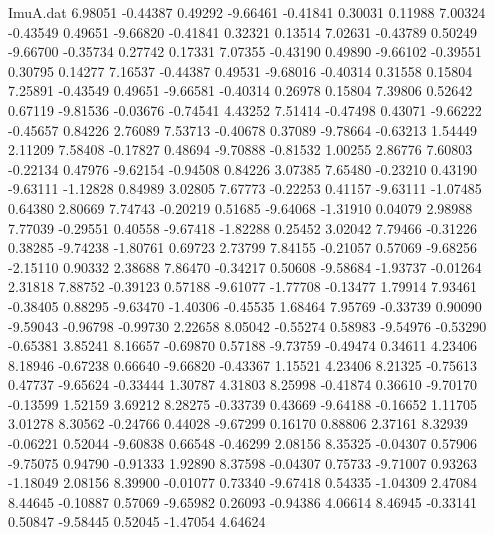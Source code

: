\begin{filecontents}{ImuA.dat}
   6.98051   -0.44387    0.49292   -9.66461   -0.41841    0.30031    0.11988
   7.00324   -0.43549    0.49651   -9.66820   -0.41841    0.32321    0.13514
   7.02631   -0.43789    0.50249   -9.66700   -0.35734    0.27742    0.17331
   7.07355   -0.43190    0.49890   -9.66102   -0.39551    0.30795    0.14277
   7.16537   -0.44387    0.49531   -9.68016   -0.40314    0.31558    0.15804
   7.25891   -0.43549    0.49651   -9.66581   -0.40314    0.26978    0.15804
   7.39806    0.52642    0.67119   -9.81536   -0.03676   -0.74541    4.43252
   7.51414   -0.47498    0.43071   -9.66222   -0.45657    0.84226    2.76089
   7.53713   -0.40678    0.37089   -9.78664   -0.63213    1.54449    2.11209
   7.58408   -0.17827    0.48694   -9.70888   -0.81532    1.00255    2.86776
   7.60803   -0.22134    0.47976   -9.62154   -0.94508    0.84226    3.07385
   7.65480   -0.23210    0.43190   -9.63111   -1.12828    0.84989    3.02805
   7.67773   -0.22253    0.41157   -9.63111   -1.07485    0.64380    2.80669
   7.74743   -0.20219    0.51685   -9.64068   -1.31910    0.04079    2.98988
   7.77039   -0.29551    0.40558   -9.67418   -1.82288    0.25452    3.02042
   7.79466   -0.31226    0.38285   -9.74238   -1.80761    0.69723    2.73799
   7.84155   -0.21057    0.57069   -9.68256   -2.15110    0.90332    2.38688
   7.86470   -0.34217    0.50608   -9.58684   -1.93737   -0.01264    2.31818
   7.88752   -0.39123    0.57188   -9.61077   -1.77708   -0.13477    1.79914
   7.93461   -0.38405    0.88295   -9.63470   -1.40306   -0.45535    1.68464
   7.95769   -0.33739    0.90090   -9.59043   -0.96798   -0.99730    2.22658
   8.05042   -0.55274    0.58983   -9.54976   -0.53290   -0.65381    3.85241
   8.16657   -0.69870    0.57188   -9.73759   -0.49474    0.34611    4.23406
   8.18946   -0.67238    0.66640   -9.66820   -0.43367    1.15521    4.23406
   8.21325   -0.75613    0.47737   -9.65624   -0.33444    1.30787    4.31803
   8.25998   -0.41874    0.36610   -9.70170   -0.13599    1.52159    3.69212
   8.28275   -0.33739    0.43669   -9.64188   -0.16652    1.11705    3.01278
   8.30562   -0.24766    0.44028   -9.67299    0.16170    0.88806    2.37161
   8.32939   -0.06221    0.52044   -9.60838    0.66548   -0.46299    2.08156
   8.35325   -0.04307    0.57906   -9.75075    0.94790   -0.91333    1.92890
   8.37598   -0.04307    0.75733   -9.71007    0.93263   -1.18049    2.08156
   8.39900   -0.01077    0.73340   -9.67418    0.54335   -1.04309    2.47084
   8.44645   -0.10887    0.57069   -9.65982    0.26093   -0.94386    4.06614
   8.46945   -0.33141    0.50847   -9.58445    0.52045   -1.47054    4.64624

\end{filecontents}
